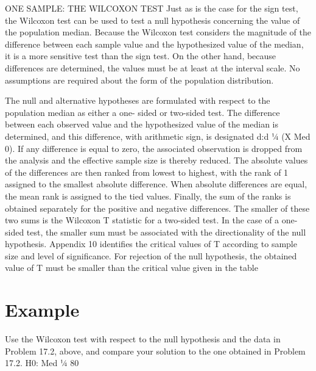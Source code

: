 ONE SAMPLE: THE WILCOXON TEST
Just as is the case for the sign test, the Wilcoxon test can be used to test a null hypothesis concerning the
value of the population median. Because the Wilcoxon test considers the magnitude of the difference between
each sample value and the hypothesized value of the median, it is a more sensitive test than the sign test. On the
other hand, because differences are determined, the values must be at least at the interval scale. No assumptions
are required about the form of the population distribution.

The null and alternative hypotheses are formulated with respect to the population median as either a one-
sided or two-sided test. The difference between each observed value and the hypothesized value of the median
is determined, and this difference, with arithmetic sign, is designated d:d ¼ (X  Med 0). If any difference is
equal to zero, the associated observation is dropped from the analysis and the effective sample size is thereby
reduced. The absolute values of the differences are then ranked from lowest to highest, with the rank of 1
assigned to the smallest absolute difference. When absolute differences are equal, the mean rank is assigned to
the tied values. Finally, the sum of the ranks is obtained separately for the positive and negative differences. 
The
smaller of these two sums is the Wilcoxon T statistic for a two-sided test. In the case of a one-sided test, the
smaller sum must be associated with the directionality of the null hypothesis. Appendix 10 identifies the critical
values of T according to sample size and level of significance. For rejection of the null hypothesis, the obtained
value of T must be smaller than the critical value given in the table

\section*{Example}
Use the Wilcoxon test with respect to the null hypothesis and the data in Problem 17.2, above, and
compare your solution to the one obtained in Problem 17.2.
H0: Med ¼ 80

